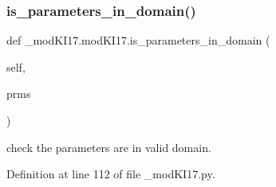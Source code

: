 \subsubsection{\texorpdfstring{is\+\_\+parameters\+\_\+in\+\_\+domain()}{is\_parameters\_in\_domain()}}
{\footnotesize\ttfamily def \+\_\+mod\+K\+I17.\+mod\+K\+I17.\+is\+\_\+parameters\+\_\+in\+\_\+domain (\begin{DoxyParamCaption}\item[{}]{self,  }\item[{}]{prms }\end{DoxyParamCaption})}

\begin{DoxyVerb}check the parameters are in valid domain.
\end{DoxyVerb}
 

Definition at line 112 of file \+\_\+mod\+K\+I17.\+py.


